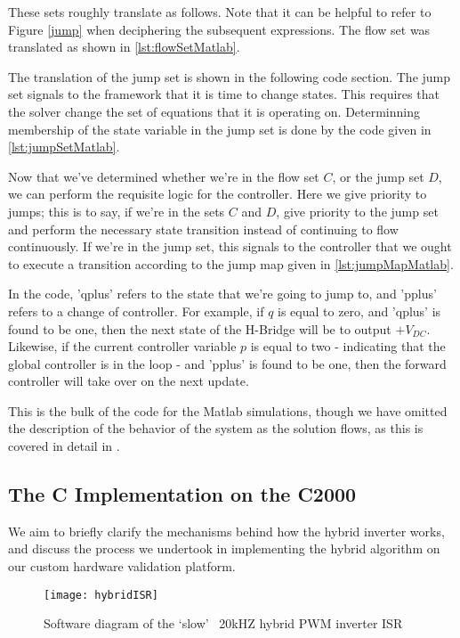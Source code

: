 These sets roughly translate as follows. Note that it can be helpful to refer to Figure \ref{jump} when deciphering the subsequent expressions. The flow set was translated as shown in \ref{lst:flowSetMatlab}.

The translation of the jump set is shown in the following code section. The jump set signals to the framework that it is time to change states. This requires that the solver change the set of equations that it is operating on. Determinning membership of the state variable in the jump set is done by the code given in \ref{lst:jumpSetMatlab}.

Now that we've determined whether we're in the flow set $C$, or the jump set $D$, we can perform the requisite logic for the controller. Here we give priority to jumps; this is to say, if we're in the sets $C$ and $D$, give priority to the jump set and perform the necessary state transition instead of continuing to flow continuously. If we're in the jump set, this signals to the controller that we ought to execute a transition according to the jump map given in \ref{lst:jumpMapMatlab}.

In the code, 'qplus' refers to the state that we're going to jump to, and 'pplus' refers to a change of controller. For example, if $q$ is equal to zero, and 'qplus' is found to be one, then the next state of the H-Bridge will be to output $+V_{DC}$. Likewise, if the current controller variable $p$ is equal to two - indicating that the global controller is in the loop - and 'pplus' is found to be one, then the forward controller will take over on the next update. 

This is the bulk of the code for the Matlab simulations, though we have omitted the description of the behavior of the system as the solution flows, as this is covered in detail in \cite{ricardo}.

\subsection{The C Implementation on the C2000}
We aim to briefly clarify the mechanisms behind how the hybrid inverter works, and discuss the process we undertook in implementing the hybrid algorithm on our custom hardware validation platform. 

\begin{figure}[h]
\begin{center}
\texttt{[image: hybridISR]}
\caption{Software diagram of the `slow' ~20kHZ hybrid PWM inverter ISR}
\label{fast}
\end{center}
\end{figure}

